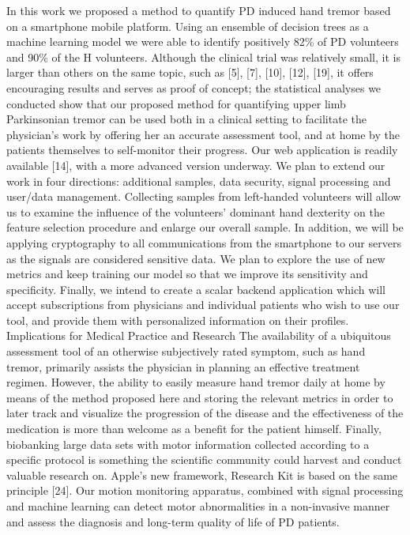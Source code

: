 In this work we proposed a method to quantify PD induced hand tremor based on a smartphone mobile platform. Using an ensemble of decision trees as a machine learning model we were able to identify positively 82\% of PD volunteers and 90\% of the H volunteers. Although the clinical trial was relatively small, it is larger than others on the same topic, such as [5], [7], [10], [12], [19], it offers encouraging results and serves as proof of concept; the statistical analyses we conducted show that our proposed method for quantifying upper limb Parkinsonian tremor can be used both in a clinical setting to facilitate the physician’s work by offering her an accurate assessment tool, and at home by the patients themselves to self-monitor their progress. 
Our web application is readily available [14], with a more advanced version underway. We plan to extend our work in four directions: additional samples, data security, signal processing and user/data management. Collecting samples from left-handed volunteers will allow us to examine the influence of the volunteers’ dominant hand dexterity on the feature selection procedure and enlarge our overall sample. In addition, we will be applying cryptography to all communications from the smartphone to our servers as the signals are considered sensitive data. We plan to explore the use of new metrics and keep training our model so that we improve its sensitivity and specificity. Finally, we intend to create a scalar backend application which will accept subscriptions from physicians and individual patients who wish to use our tool, and provide them with personalized information on their profiles.
Implications for Medical Practice and Research 
The availability of a ubiquitous assessment tool of an otherwise subjectively rated symptom, such as hand tremor, primarily assists the physician in planning an effective treatment regimen. However, the ability to easily measure hand tremor daily at home by means of the method proposed here and storing the relevant metrics in order to later track and visualize the progression of the disease and the effectiveness of the medication is more than welcome as a benefit for the patient himself. Finally, biobanking large data sets with motor information collected according to a specific protocol is something the scientific community could harvest and conduct valuable research on. Apple’s new framework, Research Kit is based on the same principle [24]. Our motion monitoring apparatus, combined with signal processing and machine learning can detect motor abnormalities in a non-invasive manner and assess the diagnosis and long-term quality of life of PD patients. 





